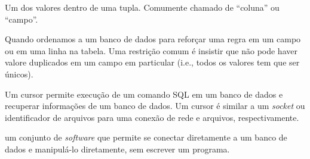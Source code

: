 \begin{descrição}


\item[atributo:] Um dos valores dentro de uma tupla. Comumente chamado de
  ``coluna'' ou ``campo''.
  
  
\item[restrição:] Quando ordenamos a um banco de dados para reforçar uma regra
em um campo ou em uma linha na tabela. Uma restrição comum é insistir que não
pode haver valore duplicados em um campo em particular (i.e., todos os
valores tem que ser únicos).



\item[cursor:] Um cursor permite execução de um comando SQL em um banco de
  dados e recuperar informações de um banco de dados. Um cursor é similar a
  um {\it socket} ou identificador de arquivos para uma conexão de rede e
  arquivos, respectivamente.
  

\item[navegador de banco de dados:] um conjunto de {\it software} que permite
  se conectar diretamente a um banco de dados e manipulá-lo diretamente, sem
  escrever um programa.
  


\end{descrição}
